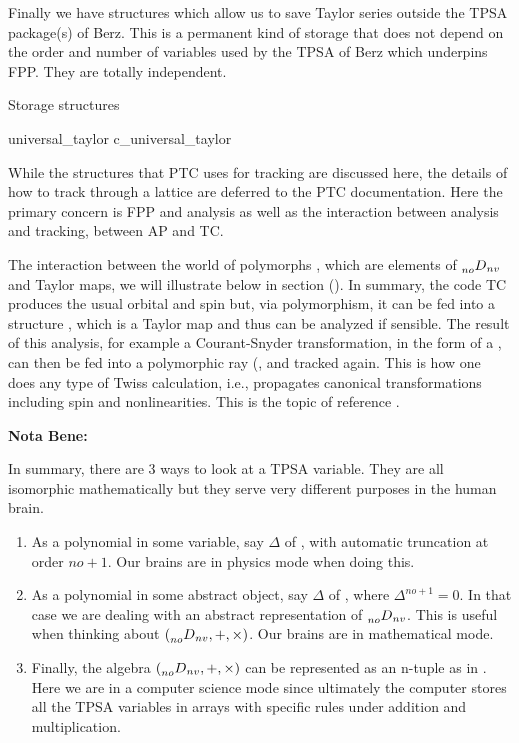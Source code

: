 \documentclass{hitec}     %
\begin{document}
{{{Finally we have structures which allow us to save Taylor series outside the TPSA package(s) of Berz. This is a permanent kind of storage that does not depend
on the order and number of variables used by the TPSA of Berz which underpins FPP. They are totally independent.
\begin{code}
Storage structures

universal_taylor
c_universal_taylor
\end{code}

While the structures that PTC uses for tracking are discussed here, the details of how to track through
a lattice are deferred to the PTC documentation. Here the primary concern is FPP and analysis as well as the interaction between analysis and tracking, between AP and TC.

 The interaction between the world of polymorphs , which are elements of $\prescript{}{no}{D}_{nv} $ and Taylor maps, we will illustrate below in section ().
In summary, the code TC produces the usual orbital and spin but, via polymorphism, it can be fed into a structure , which is a Taylor map and thus can be analyzed if sensible. The result of this analysis, for example a Courant-Snyder transformation, in the form of a , can then be fed into a polymorphic ray (, and tracked again. This is how one does any type of Twiss calculation, i.e., propagates canonical transformations including spin and nonlinearities. This is the topic of reference \cite{thenewbook}.

{\bf Nota Bene:}

In summary, there are 3 ways to look at a TPSA variable. They are all isomorphic mathematically but they serve very different purposes in the human brain.

\begin{enumerate}
\item As a polynomial in some variable, say $\Delta $ of , with automatic truncation at order $no+1$. Our brains are in physics mode when doing this.
\item As a polynomial in some abstract object, say $\Delta $ of , where  ${\Delta }^{no+1}=0$.  In that case we are dealing with an abstract representation of $\prescript{}{no}{D}_{nv} $.  This is useful when thinking about $(\prescript{}{no}{D}_{nv},+,\times )$. Our brains are in mathematical mode. 
\item\label{itemsp} Finally, the algebra $(\prescript{}{no}{D}_{nv},+,\times )$ can be represented as an n-tuple as in . Here we are in a computer science mode since ultimately the computer stores all the TPSA variables in arrays with specific rules under addition and multiplication. 
\end{enumerate}

}}}
\end{document}
